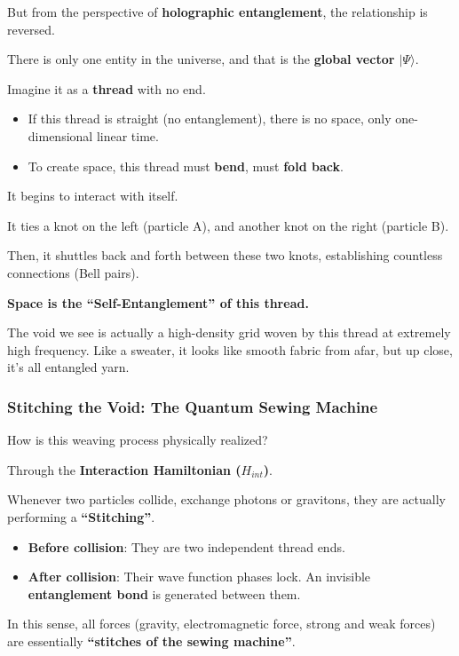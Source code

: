 But from the perspective of \textbf{holographic entanglement}, the relationship is reversed.

There is only one entity in the universe, and that is the \textbf{global vector $|\Psi\rangle$}.

Imagine it as a \textbf{thread} with no end.

\begin{itemize}
\item If this thread is straight (no entanglement), there is no space, only one-dimensional linear time.

\item To create space, this thread must \textbf{bend}, must \textbf{fold back}.
\end{itemize}

It begins to interact with itself.

It ties a knot on the left (particle A), and another knot on the right (particle B).

Then, it shuttles back and forth between these two knots, establishing countless connections (Bell pairs).

\textbf{Space is the ``Self-Entanglement'' of this thread.}

The void we see is actually a high-density grid woven by this thread at extremely high frequency. Like a sweater, it looks like smooth fabric from afar, but up close, it's all entangled yarn.

\subsubsection{Stitching the Void: The Quantum Sewing Machine}

How is this weaving process physically realized?

Through the \textbf{Interaction Hamiltonian ($H_{int}$)}.

Whenever two particles collide, exchange photons or gravitons, they are actually performing a \textbf{``Stitching''}.

\begin{itemize}
\item \textbf{Before collision}: They are two independent thread ends.

\item \textbf{After collision}: Their wave function phases lock. An invisible \textbf{entanglement bond} is generated between them.
\end{itemize}

In this sense, all forces (gravity, electromagnetic force, strong and weak forces) are essentially \textbf{``stitches of the sewing machine''}.

